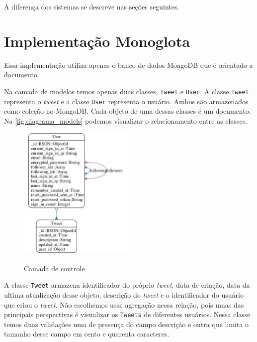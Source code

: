 A diferença dos sistemas se descreve nas seções seguintes.

\section{Implementação Monoglota}
\label{sec:monoglot}

Essa implementação utiliza apenas o banco de dados MongoDB que é orientado a documento.

Na camada de modelos temos apenas duas classes, \verb|Tweet| e \verb|User|. A classe \verb|Tweet| representa o \textit{tweet} e a classe \verb|User| representa o usuário. Ambos são armazenados como coleção no MongoDB. Cada objeto de uma dessas classes é um documento. Na \autoref{fig:diagrama_models} podemos visualizar o relacionamento entre as classes.
\begin{figure}[H]
    \centering
    \caption{Camada de controle}
    \includegraphics[width=0.5\textwidth]{./04-figuras/models_complete.jpg}
    \label{fig:diagrama_models}
\end{figure}
A classe \verb|Tweet| armazena identificador do próprio \textit{tweet}, data de criação, data da ultima atualização desse objeto, descrição do \textit{tweet} e o identificador do usuário que criou o \textit{tweet}. Não escolhemos usar agregação nessa relação, pois umas das principais perspectivas é visualizar os \verb|Tweets| de diferentes usuários. Nessa classe temos duas validações uma de presença do campo descrição e outra que limita o tamanho desse campo em cento e quarenta caracteres.

